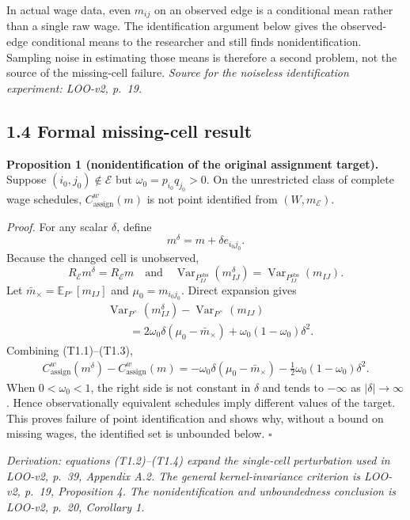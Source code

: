 \documentclass[11pt]{article}
\begin{document}
In actual wage data, even \(m_{ij}\) on an observed edge is a conditional mean
rather than a single raw wage.  The identification argument below gives the
observed-edge conditional means to the researcher and still finds
nonidentification.  Sampling noise in estimating those means is therefore a
second problem, not the source of the missing-cell failure.
\textit{Source for the noiseless identification experiment: LOO-v2, p.\ 19.}

\subsection{1.4 Formal missing-cell result}

\textbf{Proposition 1 (nonidentification of the original assignment target).}
Suppose \((i_0,j_0)\notin\mathcal E\) but
\(\omega_0=p_{i_0}q_{j_0}>0\).  On the unrestricted class of complete wage
schedules, \(C^w_{\mathrm{assign}}(m)\) is not point identified from
\((W,m_{\mathcal E})\).

\textit{Proof.}
For any scalar \(\delta\), define
\[
m^\delta=m+\delta e_{i_0j_0}.
\]
Because the changed cell is unobserved,
\[
R_{\mathcal E}m^\delta=R_{\mathcal E}m
\quad\text{and}\quad
\operatorname{Var}_{P^{\mathrm{obs}}_{IJ}}(m^\delta_{IJ})
=\operatorname{Var}_{P^{\mathrm{obs}}_{IJ}}(m_{IJ}).
\tag{T1.2}
\]
Let \(\bar m_\times=\mathbb E_{P^\times}[m_{IJ}]\) and
\(\mu_0=m_{i_0j_0}\).  Direct expansion gives
\[
\begin{aligned}
&\operatorname{Var}_{P^\times}(m^\delta_{IJ})
-\operatorname{Var}_{P^\times}(m_{IJ})\\
&\qquad
=2\omega_0\delta(\mu_0-\bar m_\times)
+\omega_0(1-\omega_0)\delta^2.
\end{aligned}
\tag{T1.3}
\]
Combining (T1.1)--(T1.3),
\[
\begin{aligned}
C^w_{\mathrm{assign}}(m^\delta)
-C^w_{\mathrm{assign}}(m)
=-\omega_0\delta(\mu_0-\bar m_\times)
-\frac12\omega_0(1-\omega_0)\delta^2.
\end{aligned}
\tag{T1.4}
\]
When \(0<\omega_0<1\), the right side is not constant in \(\delta\) and tends
to \(-\infty\) as \(|\delta|\to\infty\).  Hence observationally equivalent
schedules imply different values of the target.  This proves failure of point
identification and shows why, without a bound on missing wages, the identified
set is unbounded below. \(\square\)

\textit{Derivation: equations (T1.2)--(T1.4) expand the single-cell
perturbation used in LOO-v2, p.\ 39, Appendix A.2.  The general
kernel-invariance criterion is LOO-v2, p.\ 19, Proposition 4.  The
nonidentification and unboundedness conclusion is LOO-v2, p.\ 20,
Corollary 1.}
\end{document}

